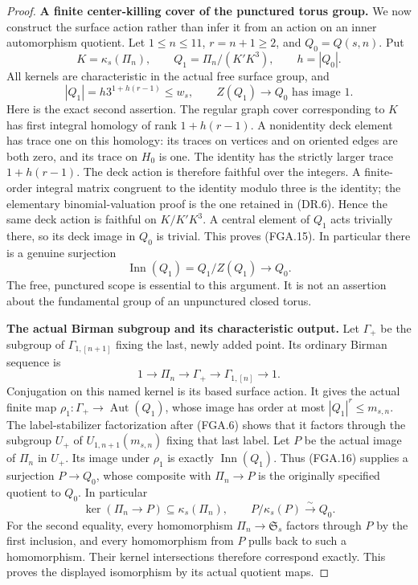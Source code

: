 \begin{proof}
\par\medskip\noindent\textbf{A finite center-killing cover of the punctured torus group.}\quad
We now construct the surface action rather than
infer it from an action on an inner automorphism
quotient.  Let $1\leq n\leq11$, $r=n+1\geq2$,
and $Q_0=Q(s,n)$.  Put
\[
 K=\kappa_s(\Pi_n),\qquad
 Q_1=\Pi_n/(K'K^3),\qquad h=|Q_0|.
                                                               \tag{FGA.14}
\]
All kernels are characteristic in the actual free
surface group, and
\[
 |Q_1|=h3^{1+h(r-1)}\leq w_s,
 \qquad Z(Q_1)\longrightarrow Q_0\text{ has image }1.
                                                               \tag{FGA.15}
\]
Here is the exact second assertion.  The regular
graph cover corresponding to $K$ has first integral
homology of rank $1+h(r-1)$.  A nonidentity deck
element has trace one on this homology: its traces
on vertices and on oriented edges are both zero,
and its trace on $H_0$ is one.  The identity has
the strictly larger trace $1+h(r-1)$.
The deck action is therefore faithful over the
integers.  A finite-order integral matrix congruent
to the identity modulo three is the identity;
the elementary binomial-valuation proof is the
one retained in (DR.6).  Hence the same deck action
is faithful on $K/K'K^3$.  A central element of
$Q_1$ acts trivially there, so its deck image in
$Q_0$ is trivial.  This proves (FGA.15).
In particular there is a genuine surjection
\[
       \operatorname{Inn}(Q_1)=Q_1/Z(Q_1)
                             \longrightarrow Q_0.
                                                               \tag{FGA.16}
\]
The free, punctured scope is essential to this
argument.  It is not an assertion about the
fundamental group of an unpunctured closed torus.

\par\medskip\noindent\textbf{The actual Birman subgroup and its characteristic output.}\quad
Let $\Gamma_+$ be the subgroup of
$\Gamma_{1,[n+1]}$ fixing the last, newly added
point.  Its ordinary Birman sequence is
\[
 1\longrightarrow\Pi_n\longrightarrow\Gamma_+
     \longrightarrow\Gamma_{1,[n]}\longrightarrow1.
                                                               \tag{FGA.17}
\]
Conjugation on this named kernel is its based
surface action.  It gives the actual finite map
$\rho_1:\Gamma_+\to\operatorname{Aut}(Q_1)$,
whose image has order at most $|Q_1|^r\leq m_{s,n}$.
The label-stabilizer factorization after (FGA.6)
shows that it factors through the subgroup $U_+$
of $U_{1,n+1}(m_{s,n})$ fixing that last label.
Let $P$ be the actual image of $\Pi_n$ in $U_+$.
Its image under $\rho_1$ is exactly
$\operatorname{Inn}(Q_1)$.  Thus (FGA.16) supplies
a surjection $P\to Q_0$, whose composite with
$\Pi_n\to P$ is the originally specified quotient
to $Q_0$.  In particular
\[
 \ker(\Pi_n\to P)\subseteq\kappa_s(\Pi_n),
 \qquad P/\kappa_s(P)\xrightarrow{\sim}Q_0.
                                                               \tag{FGA.18}
\]
For the second equality, every homomorphism
$\Pi_n\to\mathfrak S_s$ factors through $P$ by
the first inclusion, and every homomorphism from
$P$ pulls back to such a homomorphism.  Their
kernel intersections therefore correspond exactly.
This proves the displayed isomorphism by its
actual quotient maps.


\end{proof}
